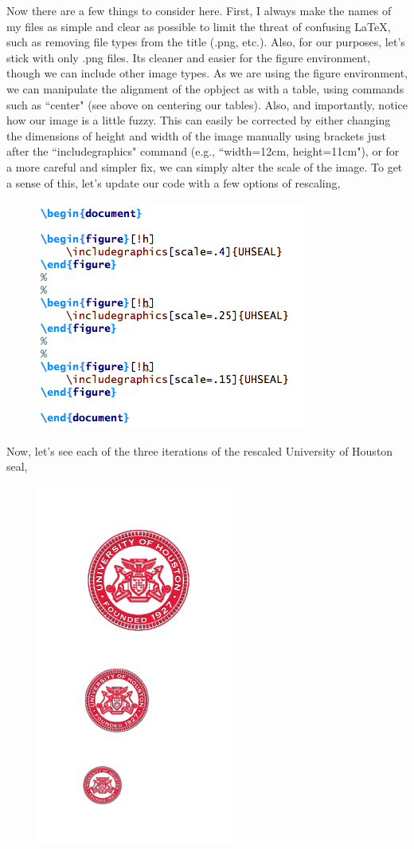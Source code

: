 \documentclass[11pt]{article}
\newcommand{\forceindent}{\leavevmode{\parindent=1.5em\indent}} %
\begin{document}
\forceindent Now there are a few things to consider here. First, I always make the names of my files as simple and clear as possible to limit the threat of confusing \LaTeX, such as removing file types from the title (.png, etc.). Also, for our purposes, let's stick with only .png files. Its cleaner and easier for the figure environment, though we can include other image types. As we are using the figure environment, we can manipulate the alignment of the opbject as with a table, using commands such as ``center" (see above on centering our tables). Also, and importantly, notice how our image is a little fuzzy. This can easily be corrected by either changing the dimensions of height and width of the image manually using brackets just after the ``includegraphics" command (e.g., ``width=12cm, height=11cm"), or for a more careful and simpler fix, we can simply alter the scale of the image. To get a sense of this, let's update our code with a few options of rescaling,

\begin{figure}[!h]
	\includegraphics[scale=.5]{CODE11} \\ %
\end{figure}

\newpage

Now, let's see each of the three iterations of the rescaled University of Houston seal,

\begin{figure}[!h]
	\includegraphics[scale=.4]{OUT11} \\ %
	\centering
\end{figure}
\end{document}

